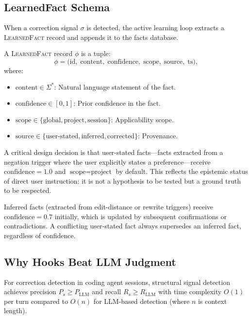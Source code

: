 \subsection{LearnedFact Schema}

When a correction signal $\sigma$ is detected, the active learning loop
extracts a \textsc{LearnedFact} record and appends it to the facts database.

\begin{definition}
\label{def:learned_fact}
A \textsc{LearnedFact} record $\phi$ is a tuple:
\begin{equation}
\phi = \bigl( \text{id},\; \text{content},\; \text{confidence},\;
              \text{scope},\; \text{source},\; \text{ts} \bigr),
\end{equation}
where:
\begin{itemize}[leftmargin=1.5em, nosep]
    \item $\text{content} \in \Sigma^*$: Natural language statement of the fact.
    \item $\text{confidence} \in [0, 1]$: Prior confidence in the fact.
    \item $\text{scope} \in \{\text{global}, \text{project}, \text{session}\}$: Applicability scope.
    \item $\text{source} \in \{\text{user-stated}, \text{inferred}, \text{corrected}\}$: Provenance.
\end{itemize}
\end{definition}

A critical design decision is that user-stated facts---facts extracted from
a negation trigger where the user explicitly states a preference---receive
$\text{confidence} = 1.0$ and $\text{scope} = \text{project}$ by default.
This reflects the epistemic status of direct user instruction: it is not a
hypothesis to be tested but a ground truth to be respected.

Inferred facts (extracted from edit-distance or rewrite triggers) receive
$\text{confidence} = 0.7$ initially, which is updated by subsequent
confirmations or contradictions. A conflicting user-stated fact always
supersedes an inferred fact, regardless of confidence.

\subsection{Why Hooks Beat LLM Judgment}

\begin{proposition}
\label{prop:structural_detection}
For correction detection in coding agent sessions, structural signal detection
achieves precision $P_s \geq P_{\text{LLM}}$ and recall $R_s \geq R_{\text{LLM}}$
with time complexity $O(1)$ per turn compared to $O(n)$ for LLM-based detection
(where $n$ is context length).
\end{proposition}

